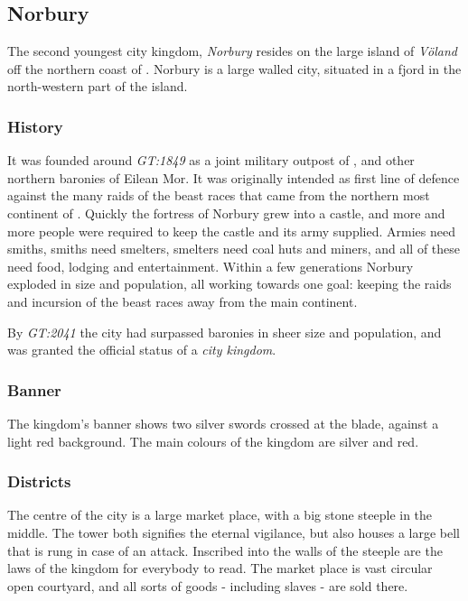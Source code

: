 \subsection{Norbury}
\label{sec:Norbury}


The second youngest city kingdom, \emph{Norbury} resides on the large island
of \emph{Völand} off the northern coast of . Norbury
is a large walled city, situated in a fjord in the north-western part of the
island.

\subsubsection{History}

It was founded around \emph{GT:1849} as a joint military outpost of
, and other northern baronies of Eilean Mor. It was
originally intended as first line of defence against the many raids of the
beast races that came from the northern most continent of
. Quickly the fortress of Norbury grew into a castle,
and more and more people were required to keep the castle and its army
supplied. Armies need smiths, smiths need smelters, smelters need coal huts
and miners, and all of these need food, lodging and entertainment. Within a
few generations Norbury exploded in size and population, all working towards
one goal: keeping the raids and incursion of the beast races away from the
main continent.

By \emph{GT:2041} the city had surpassed baronies in sheer size and population,
and was granted the official status of a \emph{city kingdom}.

\subsubsection{Banner}

The kingdom's banner shows two silver swords crossed at the blade, against a
light red background. The main colours of the kingdom are silver and red.

\subsubsection{Districts}

The centre of the city is a large market place, with a big stone steeple in
the middle. The tower both signifies the eternal vigilance, but also houses a
large bell that is rung in case of an attack. Inscribed into the walls of
the steeple are the laws of the kingdom for everybody to read. The market
place is vast circular open courtyard, and all sorts of goods - including
slaves - are sold there.

